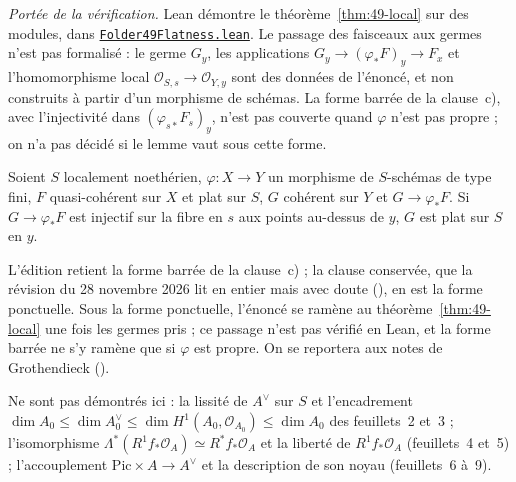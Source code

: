\begin{sloppypar}
\begingroup\raggedright
\noindent\emph{Portée de la vérification.} Lean démontre le théorème~\ref{thm:49-local} sur des modules, dans \href{\leanblobmain/AlgebraicGeometry/Folder49Flatness.lean}{\texttt{Folder49Flatness.\allowbreak{}lean}}. Le passage des faisceaux aux germes n'est pas formalisé : le germe $G_y$, les applications $G_y \to (\varphi_*F)_y \to F_x$ et l'homomorphisme local $\mathcal O_{S,s} \to \mathcal O_{Y,y}$ sont des données de l'énoncé, et non construits à partir d'un morphisme de schémas. La forme barrée de la clause~c), avec l'injectivité dans $(\varphi_{s*}F_s)_y$, n'est pas couverte quand $\varphi$ n'est pas propre ; on n'a pas décidé si le lemme vaut sous cette forme.
\end{sloppypar}\par\endgroup

\begin{encadre}
\begin{theoreme*}\nonverifie
Soient $S$ localement noethérien, $\varphi : X \to Y$ un morphisme de $S$-schémas de type fini, $F$ quasi-cohérent sur $X$ et plat sur $S$, $G$ cohérent sur $Y$ et $G \to \varphi_*F$. Si $G \to \varphi_*F$ est injectif sur la fibre en $s$ aux points au-dessus de $y$, $G$ est plat sur $S$ en $y$.
\end{theoreme*}
\end{encadre}
{\small L'édition retient la forme barrée de la clause~c) ; la clause conservée, que la révision du 28 novembre 2026 lit en entier mais avec doute (), en est la forme ponctuelle. Sous la forme ponctuelle, l'énoncé se ramène au théorème~\ref{thm:49-local} une fois les germes pris ; ce passage n'est pas vérifié en Lean, et la forme barrée ne s'y ramène que si $\varphi$ est propre. On se reportera aux notes de Grothendieck ().\par}

Ne sont pas démontrés ici : la lissité de $A^\vee$ sur $S$ et l'encadrement $\dim A_0 \leqslant \dim A^\vee_0 \leqslant \dim H^1(A_0, \mathcal O_{A_0}) \leqslant \dim A_0$ des feuillets~2 et~3 ; l'isomorphisme $\Lambda^*(R^1f_*\mathcal O_A) \simeq R^*f_*\mathcal O_A$ et la liberté de $R^1f_*\mathcal O_A$ (feuillets~4 et~5) ; l'accouplement $\mathrm{Pic} \times A \to A^\vee$ et la description de son noyau (feuillets~6 à~9).
